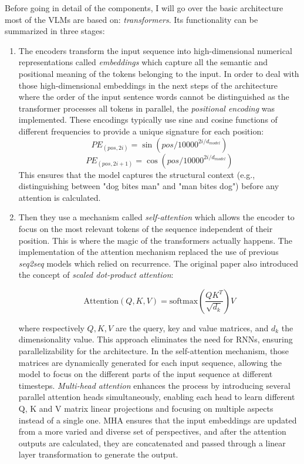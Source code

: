 
Before going in detail of the components, I will go over the basic architecture most of the VLMs are based on: \textit{transformers}. Its functionality can be summarized in three stages:

\begin{enumerate}
	\item The encoders transform the input sequence into high-dimensional numerical representations called \textit{embeddings} which capture all the semantic and positional meaning of the tokens belonging to the input. In order to deal with those high-dimensional embeddings in the next steps of the architecture where the order of the input sentence words cannot be distinguished as the transformer processes all tokens in parallel, the \textit{positional encoding} was implemented. These encodings typically use sine and cosine functions of different frequencies to provide a unique signature for each position:
	\[
	PE_{(pos, 2i)} = \sin(pos / 10000^{2i/d_{model}})
	\]
	\[
	PE_{(pos, 2i+1)} = \cos(pos / 10000^{2i/d_{model}})
	\]
	This ensures that the model captures the structural context (e.g., distinguishing between "dog bites man" and "man bites dog") before any attention is calculated.
	
	\item Then they use a mechanism called \textit{self-attention} which allows the encoder to focus on the most relevant tokens of the sequence independent of their position. This is where the magic of the transformers actually happens. The implementation of the attention mechanism replaced the use of previous \textit{seq2seq} models which relied on recurrence. The original paper also introduced the concept of \textit{scaled dot-product attention}: 
	
	$$\text{Attention}(Q, K, V) = \text{softmax}\left(\frac{QK^T}{\sqrt{d_k}}\right)V$$
	
	where respectively $Q, K, V$ are the query, key and value matrices, and $d_{k}$ the dimensionality value. This approach eliminates the need for RNNs, ensuring parallelizability for the architecture. In the self-attention mechanism, those matrices are dynamically generated for each input sequence, allowing the model to focus on the different parts of the input sequence at different timesteps. \textit{Multi-head attention} enhances the process by introducing several parallel attention heads simultaneously, enabling each head to learn different Q, K and V matrix linear projections and focusing on multiple aspects instead of a single one. MHA ensures that the input embeddings are updated from a more varied and diverse set of perspectives, and after the attention outputs are calculated, they are concatenated and passed through a linear layer transformation to generate the output. 
	

\end{enumerate}
